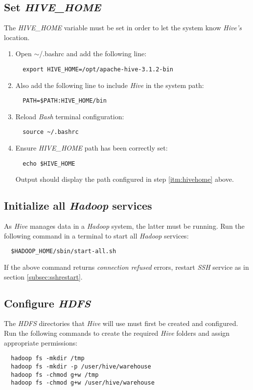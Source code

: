 \documentclass{article}
\begin{document}
  \subsection{Set \emph{HIVE\_HOME}}
  The \emph{HIVE\_HOME} variable must be set in order to let the system know \emph{Hive's}
  location.
  \begin{enumerate}
  \item Open $\sim$/.bashrc and add the following line:
  \label{itm:hivehome}
  \begin{verbatim}
  export HIVE_HOME=/opt/apache-hive-3.1.2-bin
  \end{verbatim}

  \item Also add the following line to include \emph{Hive} in the system path:
  \begin{verbatim}
  PATH=$PATH:HIVE_HOME/bin
  \end{verbatim}

  \item Reload \emph{Bash} terminal configuration:
  \begin{verbatim}
  source ~/.bashrc
  \end{verbatim}
  
  \item Ensure \emph{HIVE\_HOME} path has been correctly set:
  \begin{verbatim}
  echo $HIVE_HOME
  \end{verbatim}
  Output should display the path configured in step \ref{itm:hivehome} above.
  \end{enumerate}

  \subsection{Initialize all \emph{Hadoop} services}
  \label{subsec:hadoopall}
  As \emph{Hive} manages data in a \emph{Hadoop} system, the latter must be running.
  Run the following command in a terminal to start all \emph{Hadoop} services:
  \begin{verbatim}
  $HADOOP_HOME/sbin/start-all.sh
  \end{verbatim}
  If the above command returns \emph{connection refused} errors, restart \emph{SSH} service as
  in section \ref{subsec:sshrestart}.

  \subsection{Configure \emph{HDFS}}
  The \emph{HDFS} directories that \emph{Hive} will use must first be created and configured.
  Run the following commands to create the required \emph{Hive} folders and assign appropriate
  permissions:
  \begin{verbatim}
  hadoop fs -mkdir /tmp 
  hadoop fs -mkdir -p /user/hive/warehouse 
  hadoop fs -chmod g+w /tmp 
  hadoop fs -chmod g+w /user/hive/warehouse
  \end{verbatim}
\end{document}

